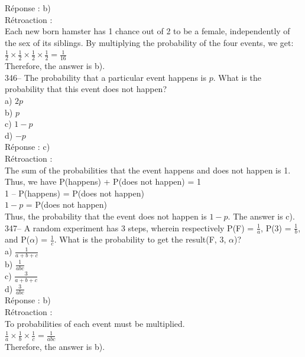 \documentclass[letterpaper, 12pt]{article}
\begin{document}
R\'eponse : b)\\

R\'etroaction : \\
Each new born hamster has 1 chance out of 2 to be a female, independently of the sex of its siblings. By multiplying the probability of the four events, we get:\\[2mm]
$\frac{1}{2}\times\frac{1}{2}\times\frac{1}{2}\times\frac{1}{2}=\frac{1}{16}$\\[2mm]
Therefore, the answer is b).\\

346-- The probability that a particular event happens is $p$. What is the probability that this event does not happen?\\

a) $2p$\\
b) $p$\\
c) $1-p$\\
d) $-p$\\

R\'eponse : c)\\

R\'etroaction : \\
The sum of the probabilities that the event happens and does not happen is 1.\\
Thus, we have P(happens) + P(does not happen) = 1\\
1 -- P(happens) = P(does not happen) \\
$1 - p$ = P(does not happen)\\
Thus, the probability that the event does not happen is $1-p$. The answer is c).\\

347-- A random experiment has 3 steps, wherein respectively P(F) =
$\frac{1}{a}$, P(3) = $\frac{1}{b}$, and P($\alpha$) = $\frac{1}{c}$. What is the probability to get the result(F, 3, $\alpha$)?\\

a) $\frac{1}{a+b+c}$\\[2mm]
b) $\frac{1}{abc}$\\[2mm]
c) $\frac{3}{a+b+c}$\\[2mm]
d) $\frac{3}{abc}$\\

R\'eponse : b)\\

R\'etroaction : \\
To probabilities of each event must be multiplied.\\[2mm]
$\frac{1}{a}\times\frac{1}{b}\times\frac{1}{c}=\frac{1}{abc}$\\[2mm]
Therefore, the answer is b).\\
\end{document}
